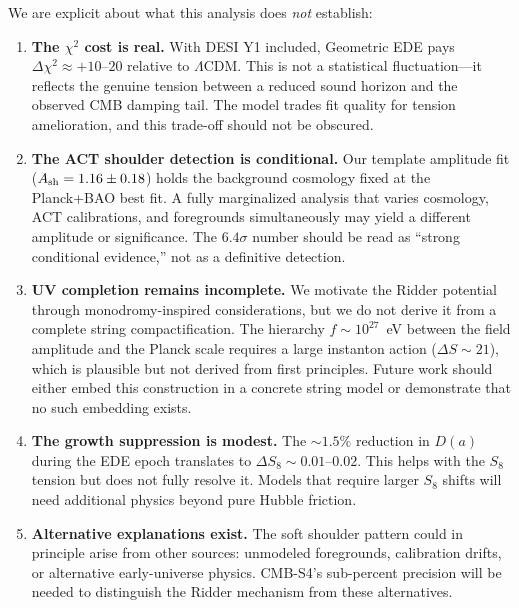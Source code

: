 \documentclass[a4paper,11pt]{article}
\begin{document}
We are explicit about what this analysis does \emph{not} establish:

\begin{enumerate}
    \item \textbf{The $\chi^2$ cost is real.} With DESI Y1 included, Geometric EDE pays $\Delta\chi^2 \approx +10$--$20$ relative to $\Lambda$CDM. This is not a statistical fluctuation---it reflects the genuine tension between a reduced sound horizon and the observed CMB damping tail. The model trades fit quality for tension amelioration, and this trade-off should not be obscured.
    
    \item \textbf{The ACT shoulder detection is conditional.} Our template amplitude fit ($A_{\rm sh} = 1.16 \pm 0.18$) holds the background cosmology fixed at the Planck+BAO best fit. A fully marginalized analysis that varies cosmology, ACT calibrations, and foregrounds simultaneously may yield a different amplitude or significance. The $6.4\sigma$ number should be read as ``strong conditional evidence,'' not as a definitive detection.
    
    \item \textbf{UV completion remains incomplete.} We motivate the Ridder potential through monodromy-inspired considerations, but we do not derive it from a complete string compactification. The hierarchy $f \sim 10^{27}$~eV between the field amplitude and the Planck scale requires a large instanton action ($\Delta S \sim 21$), which is plausible but not derived from first principles. Future work should either embed this construction in a concrete string model or demonstrate that no such embedding exists.
    
    \item \textbf{The growth suppression is modest.} The $\sim 1.5\%$ reduction in $D(a)$ during the EDE epoch translates to $\Delta S_8 \sim 0.01$--$0.02$. This helps with the $S_8$ tension but does not fully resolve it. Models that require larger $S_8$ shifts will need additional physics beyond pure Hubble friction.
    
    \item \textbf{Alternative explanations exist.} The soft shoulder pattern could in principle arise from other sources: unmodeled foregrounds, calibration drifts, or alternative early-universe physics. CMB-S4's sub-percent precision will be needed to distinguish the Ridder mechanism from these alternatives.
\end{enumerate}
\end{document}
